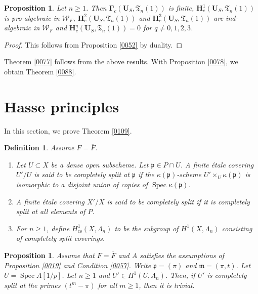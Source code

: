\documentclass{amsart}
\newtheorem{Prop}[Thm]{Proposition}
\newtheorem{Def}[Thm]{Definition}
\theoremstyle{remark}
\numberwithin{equation}{section}
\newcommand{\closure}[1]{\overline{#1}}
\newcommand{\alg}[1]{\mathbf{#1}}
\newcommand{\ideal}[1]{\mathfrak{#1}}
\newcommand{\cs}{\mathrm{cs}}
\DeclareMathOperator{\Spec}{Spec}
\begin{document}
\begin{Prop}
	Let $n \ge 1$.
	Then $\alg{\Gamma}_{c}(\alg{U}_{S}, \mathfrak{T}_{n}(1))$ is finite,
	$\alg{H}^{1}_{c}(\alg{U}_{S}, \mathfrak{T}_{n}(1))$ is pro-algebraic in $\mathcal{W}_{F}$,
	$\alg{H}^{2}_{c}(\alg{U}_{S}, \mathfrak{T}_{n}(1))$ and
	$\alg{H}^{3}_{c}(\alg{U}_{S}, \mathfrak{T}_{n}(1))$ are ind-algebraic in $\mathcal{W}_{F}$ and
	$\alg{H}^{q}_{c}(\alg{U}_{S}, \mathfrak{T}_{n}(1)) = 0$ for $q \ne 0, 1, 2, 3$.
\end{Prop}

\begin{proof}
	This follows from Proposition \ref{0052} by duality.
\end{proof}

Theorem \ref{0077} follows from the above results.
With Proposition \ref{0078},
we obtain Theorem \ref{0088}.


\section{Hasse principles}
\label{0116}

In this section, we prove Theorem \ref{0109}.

\begin{Def}
	Assume $F = \closure{F}$.
	\begin{enumerate}
		\item
			Let $U \subset X$ be a dense open subscheme.
			Let $\ideal{p} \in P \cap U$.
			A finite \'etale covering $U' / U$ is said to be \emph{completely split at $\ideal{p}$}
			if the $\kappa(\ideal{p})$-scheme $U' \times_{U} \kappa(\ideal{p})$ is isomorphic
			to a disjoint union of copies of $\Spec \kappa(\ideal{p})$.
		\item
			A finite \'etale covering $X' / X$ is said to be \emph{completely split}
			if it is completely split at all elements of $P$.
		\item
			For $n \ge 1$,
			define $H^{1}_{\cs}(X, \Lambda_{n})$ to be the subgroup of $H^{1}(X, \Lambda_{n})$
			consisting of completely split coverings.
	\end{enumerate}
\end{Def}

\begin{Prop} \label{0060}
	Assume that $F = \closure{F}$ and
	$A$ satisfies the assumptions of Proposition \ref{0019}
	and Condition \eqref{0057}.
	Write $\ideal{p} = (\pi)$ and $\ideal{m} = (\pi, t)$.
	Let $U = \Spec A[1 / p]$.
	Let $n \ge 1$ and $U' \in H^{1}(U, \Lambda_{n})$.
	Then, if $U'$ is completely split at the primes $(t^{m} - \pi)$ for all $m \ge 1$,
	then it is trivial.
\end{Prop}
\end{document}
